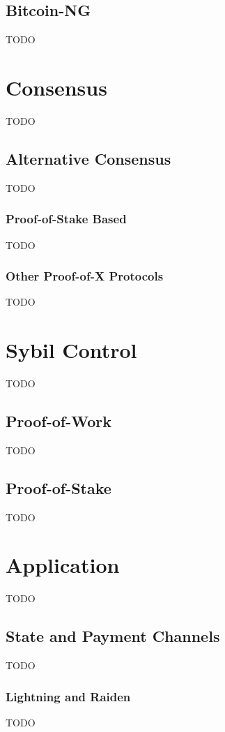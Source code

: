 \documentclass{article}
\begin{document}
\subsection{Bitcoin-NG}
TODO


\section{Consensus}
TODO

\subsection{Alternative Consensus}
TODO

\subsubsection{Proof-of-Stake Based}
TODO

\subsubsection{Other Proof-of-X Protocols}
TODO


\section{Sybil Control}
TODO

\subsection{Proof-of-Work}
TODO

\subsection{Proof-of-Stake}
TODO


\section{Application}
TODO

\subsection{State and Payment Channels}
TODO

\subsubsection{Lightning and Raiden}
TODO
\end{document}
